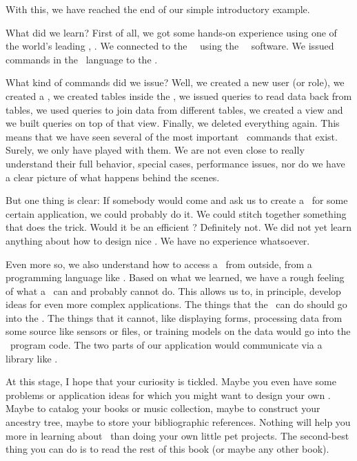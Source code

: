 %
%
%
With this, we have reached the end of our simple introductory example.

What did we learn?
First of all, we got some hands-on experience using one of the world's leading \dbms, \postgresql.
We connected to the \postgresql\ \server\ using the \psql\ \client\ software.
We issued commands in the \sql\ language to the \dbms.

What kind of commands did we issue?
Well, we created a new user (or role), we created a \db, we created tables inside the \db, we issued queries to read data back from tables, we used queries to join data from different tables, we created a view and we built queries on top of that view.
Finally, we deleted everything again.
This means that we have seen several of the most important \sql\ commands that exist.
Surely, we only have played with them.
We are not even close to really understand their full behavior, special cases, performance issues, nor do we have a clear picture of what happens behind the scenes.

But one thing is clear:
If somebody would come and ask us to create a \db\ for some certain application, we could probably do it.
We could stitch together something that does the trick.
Would it be an efficient \db?
Definitely not.
We did not yet learn anything about how to design nice \dbs.
We have no experience whatsoever.

Even more so, we also understand how to access a \db\ from outside, from a programming language like \python.
Based on what we learned, we have a rough feeling of what a \dbms\ can and probably cannot do.
This allows us to, in principle, develop ideas for even more complex applications.
The things that the \dbms\ can do should go into the \db.
The things that it cannot, like displaying forms, processing data from some source like sensors or files, or training  models on the data would go into the \python\ program code.
The two parts of our application would communicate via a library like \psycopg.

At this stage, I hope that your curiosity is tickled.
Maybe you even have some problems or application ideas for which you might want to design your own \db.
Maybe to catalog your books or music collection, maybe to construct your ancestry tree, maybe to store your bibliographic references.
Nothing will help you more in learning about \dbs\ than doing your own little pet projects.
The second-best thing you can do is to read the rest of this book (or maybe any other book).%
%
\endhsection%
%
